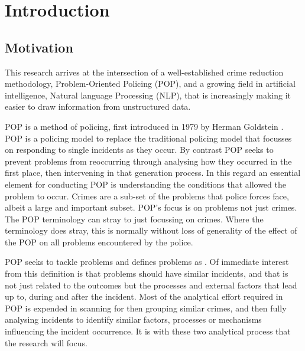 \chapter{Introduction}

\section{Motivation}
This research arrives at the intersection of a well-established crime reduction methodology, Problem-Oriented Policing (POP), and a growing field in artificial intelligence, Natural language Processing (NLP), that is increasingly making it easier to draw information from unstructured data. 

POP is a method of policing, first introduced in 1979 by Herman Goldstein \parencite{gold79} . POP is  a policing model to replace the traditional policing model that focusses on responding to single incidents as they occur. By contrast POP seeks to prevent problems from reoccurring through analysing how they occurred in the first place, then intervening in that generation process. In this regard an essential element for conducting POP is understanding the conditions that allowed the problem to occur. Crimes are a sub-set of the problems that police forces face, albeit a large and important subset. POP's focus is on problems not just crimes. The POP terminology can stray to just focussing on crimes. Where the terminology does stray, this is normally without loss of generality of the effect of the POP on all problems encountered by the police.

POP seeks to tackle problems and defines problems as  \parencite{popchap11}. Of immediate interest from this definition is that problems should have similar incidents, and that is not just related to the outcomes but the processes and external factors that lead up to, during and after the incident. Most of the analytical effort required in POP is expended in scanning for then grouping similar crimes, and then fully analysing incidents to identify similar factors, processes or mechanisms influencing the incident occurrence. It is with these two analytical process that the research will focus.

